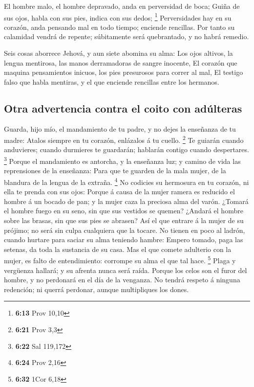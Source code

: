  El hombre malo, el hombre depravado, anda en perversidad
de boca;  Guiña de sus ojos, habla con sus pies, indica con
sus dedos; \footnote{\textbf{6:13} Prov 10,10} 
Perversidades hay en su corazón, anda pensando mal en todo tiempo;
enciende rencillas.  Por tanto su calamidad vendrá de
repente; súbitamente será quebrantado, y no habrá remedio.

 Seis cosas aborrece Jehová, y aun siete abomina su alma:
 Los ojos altivos, la lengua mentirosa, las manos
derramadoras de sangre inocente,  El corazón que maquina
pensamientos inicuos, los pies presurosos para correr al mal,
 El testigo falso que habla mentiras, y el que enciende
rencillas entre los hermanos.

\hypertarget{otra-advertencia-contra-el-coito-con-aduxfalteras}{%
\subsection{Otra advertencia contra el coito con
adúlteras}\label{otra-advertencia-contra-el-coito-con-aduxfalteras}}

 Guarda, hijo mío, el mandamiento de tu padre, y no dejes
la enseñanza de tu madre:  Atalos siempre en tu corazón,
enlázalos á tu cuello. \footnote{\textbf{6:21} Prov 3,3} 
Te guiarán cuando anduvieres; cuando durmieres te guardarán; hablarán
contigo cuando despertares. \footnote{\textbf{6:22} Sal 119,172}
 Porque el mandamiento es antorcha, y la enseñanza luz; y
camino de vida las reprensiones de la enseñanza:  Para que
te guarden de la mala mujer, de la blandura de la lengua de la extraña.
\footnote{\textbf{6:24} Prov 2,16}  No codicies su
hermosura en tu corazón, ni ella te prenda con sus ojos: 
Porque á causa de la mujer ramera es reducido el hombre á un bocado de
pan; y la mujer caza la preciosa alma del varón.  ¿Tomará
el hombre fuego en su seno, sin que sus vestidos se quemen?
 ¿Andará el hombre sobre las brasas, sin que sus pies se
abrasen?  Así el que entrare á la mujer de su prójimo; no
será sin culpa cualquiera que la tocare.  No tienen en poco
al ladrón, cuando hurtare para saciar su alma teniendo hambre:
 Empero tomado, paga las setenas, da toda la sustancia de
su casa.  Mas el que comete adulterio con la mujer, es
falto de entendimiento: corrompe su alma el que tal hace. \footnote{\textbf{6:32}
  1Cor 6,18}  Plaga y vergüenza hallará; y su afrenta nunca
será raída.  Porque los celos son el furor del hombre, y no
perdonará en el día de la venganza.  No tendrá respeto á
ninguna redención; ni querrá perdonar, aunque multipliques los dones.

